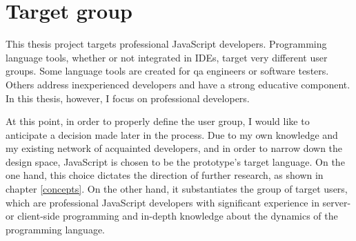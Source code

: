 \section{Target group}\label{target-group}

This thesis project targets professional JavaScript developers.
Programming language tools, whether or not integrated in IDEs, target
very different user groups. Some language tools are created for \ac{qa}
engineers or software testers. Others address inexperienced developers
and have a strong educative component. In this thesis, however, I focus
on professional developers.

At this point, in order to properly define the user group, I would like
to anticipate a decision made later in the process. Due to my own
knowledge and my existing network of acquainted developers, and in order
to narrow down the design space, JavaScript is chosen to be the
prototype’s target language. On the one hand, this choice dictates the
direction of further research, as shown in chapter \ref{concepts}. On
the other hand, it substantiates the group of target users, which are
professional JavaScript developers with significant experience in
server- or client-side programming and in-depth knowledge about the
dynamics of the programming language.
